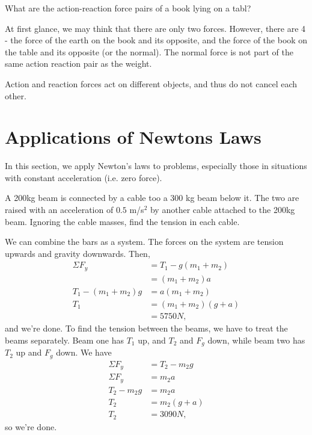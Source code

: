 \documentclass[11pt]{article}
\begin{document}
\begin{question}
	What are the action-reaction force pairs of a book lying on a tabl?
\end{question}
\begin{solution}
	At first glance, we may think that there are only two forces. However, there are 4 - the force of the earth on the book and its opposite, and the force of the book on the table and its opposite (or the normal). The normal force is not part of the same action reaction pair as the weight.
\end{solution}

\begin{remark}
	Action and reaction forces act on different objects, and thus do not cancel each other.
\end{remark}

\section{Applications of Newtons Laws}
In this section, we apply Newton's laws to problems, especially those in situations with constant acceleration (i.e. zero force).
\begin{example}
	A 200kg beam is connected by a cable too a 300 kg beam below it. The two are raised with an acceleration of $0.5$ m/s$^2$ by another cable attached to the 200kg beam. Ignoring the cable masses, find the tension in each cable.
\end{example}

\begin{solution}
We can combine the bars as a system. The forces on the system are tension upwards and gravity downwards. Then,
\begin{align*}
	\Sigma F_y &= T_1 - g(m_1+m_2) \\
	&= (m_1+m_2)a \\
	T_1 - (m_1+m_2)g &= a(m_1+m_2) \\
	T_1 &= (m_1+m_2)(g+a) \\
	&= \boxed{5750 N},
\end{align*}
and we're done. To find the tension between the beams, we have to treat the beams separately. Beam one has $T_1$ up, and $T_2$ and $F_g$ down, while beam two has $T_2$ up and $F_g$ down. We have
\begin{align*}
	\Sigma F_y &= T_2 - m_2g \\
	\Sigma F_y &= m_2a \\
	T_2 - m_2g &= m_2a \\
	T_2 &= m_2(g+a) \\
	T_2 &= \boxed{3090 N},
\end{align*}
so we're done.
\end{solution}
\end{document}

